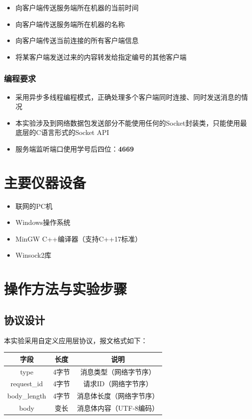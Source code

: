 \documentclass[12pt,a4paper]{article}
\begin{document}
\begin{itemize}
    \item 向客户端传送服务端所在机器的当前时间
    \item 向客户端传送服务端所在机器的名称
    \item 向客户端传送当前连接的所有客户端信息
    \item 将某客户端发送过来的内容转发给指定编号的其他客户端
\end{itemize}

\subsubsection{编程要求}
\begin{itemize}
    \item 采用异步多线程编程模式，正确处理多个客户端同时连接、同时发送消息的情况
    \item 本实验涉及到网络数据包发送部分不能使用任何的Socket封装类，只能使用最底层的C语言形式的Socket API
    \item 服务端监听端口使用学号后四位：\textbf{4669}
\end{itemize}

\section{主要仪器设备}

\begin{itemize}
    \item 联网的PC机
    \item Windows操作系统
    \item MinGW C++编译器（支持C++17标准）
    \item Winsock2库
\end{itemize}

\section{操作方法与实验步骤}

\subsection{协议设计}

本实验采用自定义应用层协议，报文格式如下：

\begin{center}
\begin{tabular}{|c|c|c|}
\hline
\textbf{字段} & \textbf{长度} & \textbf{说明} \\
\hline
type & 4字节 & 消息类型（网络字节序） \\
\hline
request\_id & 4字节 & 请求ID（网络字节序） \\
\hline
body\_length & 4字节 & 消息体长度（网络字节序） \\
\hline
body & 变长 & 消息体内容（UTF-8编码） \\
\hline
\end{tabular}
\end{center}
\end{document}
